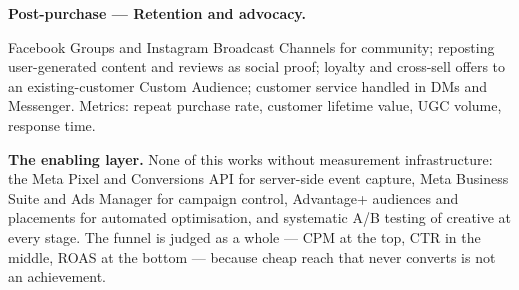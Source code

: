 \begin{qlist}
\textbf{Post-purchase --- Retention and advocacy.}
\begin{apts}\setcounter{enumi}{10}
\item Facebook Groups and Instagram Broadcast Channels for community; reposting
      user-generated content and reviews as social proof; loyalty and
      cross-sell offers to an existing-customer Custom Audience; customer
      service handled in DMs and Messenger. Metrics: repeat purchase rate,
      customer lifetime value, UGC volume, response time.
\end{apts}

\textbf{The enabling layer.} None of this works without measurement
infrastructure: the Meta Pixel and Conversions API for server-side event
capture, Meta Business Suite and Ads Manager for campaign control, Advantage+
audiences and placements for automated optimisation, and systematic A/B testing
of creative at every stage. The funnel is judged as a whole --- CPM at the top,
CTR in the middle, ROAS at the bottom --- because cheap reach that never
converts is not an achievement.


\end{qlist}
